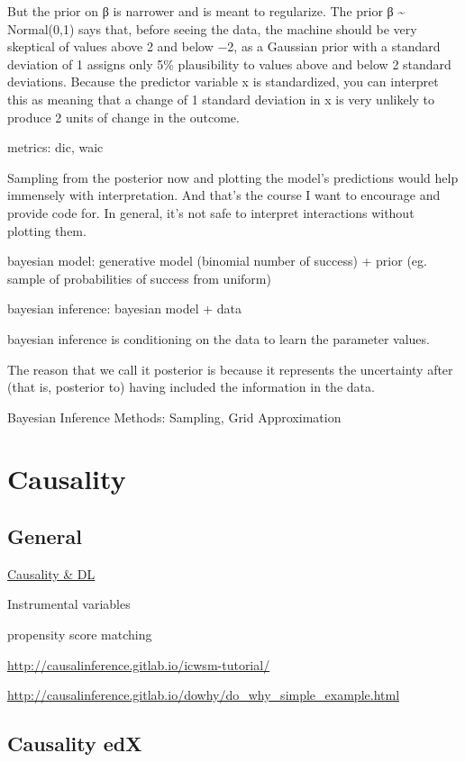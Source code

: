 \documentclass[]{book}
\begin{document}
But the prior on β is narrower and is meant to regularize. The prior β \textasciitilde{} Normal(0,1) says that, before seeing the data, the machine should be very skeptical of values above 2 and below −2, as a Gaussian prior with a standard deviation of 1 assigns only 5\% plausibility to values above and below 2 standard deviations. Because the predictor variable x is standardized, you can interpret this as meaning that a change of 1 standard deviation in x is very unlikely to produce 2 units of change in the outcome.

metrics: dic, waic

Sampling from the posterior now and plotting the model's predictions would help immensely with interpretation. And that's the course I want to encourage and provide code for. In general, it's not safe to interpret interactions without plotting them.

bayesian model: generative model (binomial number of success) + prior (eg. sample of probabilities of success from uniform)

bayesian inference: bayesian model + data

bayesian inference is conditioning on the data to learn the parameter values.

The reason that we call it posterior is because it represents the uncertainty after (that is, posterior to) having included the information in the data.

Bayesian Inference Methods: Sampling, Grid Approximation

\hypertarget{causality}{%
\chapter{Causality}\label{causality}}

\hypertarget{general-9}{%
\section{General}\label{general-9}}

\href{https://twitter.com/tdietterich/status/1034631407904018437}{Causality \& DL}

Instrumental variables

propensity score matching

\url{http://causalinference.gitlab.io/icwsm-tutorial/}

\url{http://causalinference.gitlab.io/dowhy/do_why_simple_example.html}

\hypertarget{causality-edx}{%
\section{Causality edX}\label{causality-edx}}
\end{document}

